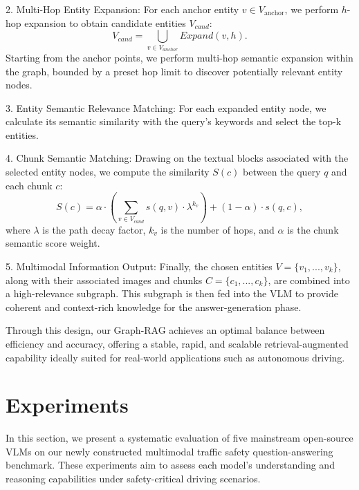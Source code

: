 \documentclass[sigconf]{acmart}
\newcommand{\qms}[1]{\textcolor{blue}{#1}} %
\begin{document}
2. Multi-Hop Entity Expansion: For each anchor entity $v\in{V}_{\mathrm{anchor}}$, we perform $h$-hop expansion to obtain candidate entities ${V}_{cand}$:
\begin{equation}{V}_{cand} = \bigcup_{v \in V_{anchor}} Expand(v,h).\end{equation}
Starting from the anchor points, we perform multi-hop semantic expansion within the graph, bounded by a preset hop limit to discover potentially relevant entity nodes.

3. Entity Semantic Relevance Matching: For each expanded entity node, we calculate its semantic similarity with the query’s keywords and select the top-k entities.

4. Chunk Semantic Matching: Drawing on the textual blocks associated with the selected entity nodes, we compute the similarity $S(c)$ between the query $q$ and each chunk $c$:
\begin{equation}S(c)=\alpha\cdot\left(\sum_{v\in V_{cand}}s(q,v)\cdot\lambda^{k_{v}}\right)+(1-\alpha)\cdot{s(q,c)},\end{equation}
where $\lambda$ is the path decay factor, $k_v$ is the number of hops, and $\alpha$ is the chunk semantic score weight. 

5. Multimodal Information Output: Finally, the chosen entities $V=\{v_1,...,v_k\}$, along with their associated images and chunks $C=\{c_1,...,c_k\}$, are combined into a high-relevance subgraph. This subgraph is then fed into the VLM to provide coherent and context-rich knowledge for the answer-generation phase.

Through this design, our Graph-RAG achieves an optimal balance between efficiency and accuracy, offering a stable, rapid, and scalable retrieval-augmented capability ideally suited for real-world applications such as autonomous driving.



\section{Experiments}
In this section, we present a systematic evaluation of five mainstream open-source VLMs on our newly constructed multimodal traffic safety question-answering benchmark. These experiments aim to assess each model’s understanding and reasoning capabilities under safety-critical driving scenarios.
\end{document}

